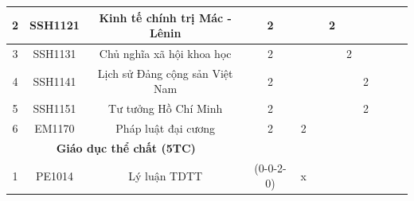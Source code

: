 \documentclass[12pt,a4paper]{report}
\begin{document}
\begin{landscape}
\begin{longtable}[c]{|c|c|c|c|c|c|c|c|c|c|c|c|}
        2                             & SSH1121                         & Kinh tế chính trị Mác - Lênin                                & 2                                                                                    &             &             & 2           &             &             &             &             &             \\ \hline
        3                             & SSH1131                         & Chủ nghĩa xã hội khoa học                                    & 2                                                                                    &             &             &             & 2           &             &             &             &             \\ \hline
        4                             & SSH1141                         & Lịch sử Đảng cộng sản Việt Nam                               & 2                                                                                    &             &             &             &             & 2           &             &             &             \\ \hline
        5                             & SSH1151                         & Tư tưởng Hồ Chí Minh                                         & 2                                                                                    &             &             &             &             & 2           &             &             &             \\ \hline
        6                             & EM1170                          & Pháp luật đại cương                                          & 2                                                                                    & 2           &             &             &             &             &             &             &             \\ \hline
        \multicolumn{3}{|c|}{\textbf{Giáo dục thể chất (5TC)}}                                                                         &                                                                                      &             &             &             &             &             &             &             &             \\ \hline
        1                             & PE1014                          & Lý luận TDTT                                                 & (0-0-2-0)                                                                            & x           &             &             &             &             &             &             &             \\ \hline

\end{longtable}
\end{landscape}
\end{document}
